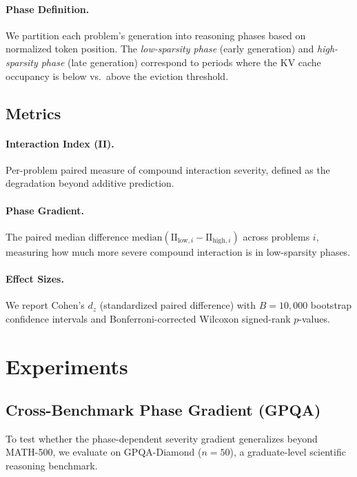 \documentclass[11pt,a4paper]{article}
\begin{document}
\paragraph{Phase Definition.} We partition each problem's generation into reasoning phases based on normalized token position. The \emph{low-sparsity phase} (early generation) and \emph{high-sparsity phase} (late generation) correspond to periods where the KV cache occupancy is below vs.\ above the eviction threshold.

\subsection{Metrics}

\paragraph{Interaction Index (II).} Per-problem paired measure of compound interaction severity, defined as the degradation beyond additive prediction.

\paragraph{Phase Gradient.} The paired median difference $\text{median}(\text{II}_{\text{low},i} - \text{II}_{\text{high},i})$ across problems $i$, measuring how much more severe compound interaction is in low-sparsity phases.

\paragraph{Effect Sizes.} We report Cohen's $d_z$ (standardized paired difference) with $B=10{,}000$ bootstrap confidence intervals and Bonferroni-corrected Wilcoxon signed-rank $p$-values.

\section{Experiments}

\subsection{Cross-Benchmark Phase Gradient (GPQA)}
\label{sec:gpqa}

To test whether the phase-dependent severity gradient generalizes beyond MATH-500, we evaluate on GPQA-Diamond ($n=50$), a graduate-level scientific reasoning benchmark.
\end{document}
